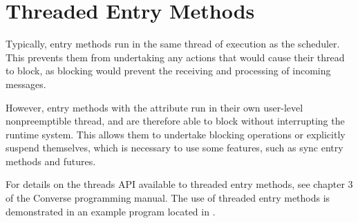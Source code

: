 \section{Threaded Entry Methods}
\label{threaded}

Typically, entry methods run in the same thread of execution as the \charmpp
scheduler. This prevents them from undertaking any actions that would cause
their thread to block, as blocking would prevent the receiving and processing of
incoming messages.

However, entry methods with the  attribute run in their own
user-level nonpreemptible thread, and are therefore able to block without
interrupting the runtime system. This allows them to undertake blocking
operations or explicitly suspend themselves, which is necessary to use some
\charmpp features, such as sync entry methods and futures.

For details on the threads API available to threaded entry methods, see chapter
3 of the Converse programming manual. The use of threaded entry methods is
demonstrated in an example program located in
.
